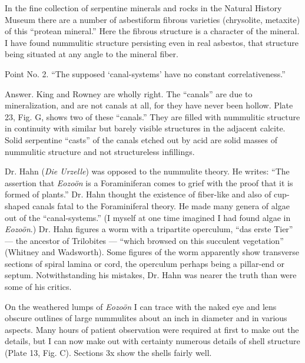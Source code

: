\documentclass[a4paper, 12pt, oneside]{article}
\begin{document}
In the fine collection of serpentine minerals and rocks in the Natural History Museum there are a number of asbestiform fibrous varieties (chrysolite, metaxite) of this ``protean mineral.'' Here the fibrous structure is a character of the mineral. I have found nummulitic structure persisting even in real asbestos, that structure being situated at any angle to the mineral fiber.

Point No. 2. ``The supposed `canal-systems' have no constant correlativeness.''

Answer. King and Rowney are wholly right. The ``canals'' are due to mineralization, and are not canals at all, for they have never been hollow. Plate 23, Fig. G, shows two of these ``canals.'' They are filled with nummulitic structure in continuity with similar but barely visible structures in the adjacent calcite. Solid serpentine ``casts'' of the canals etched out by acid are solid masses of nummulitic structure and not structureless infillings.

Dr. Hahn (\emph{Die Urzelle}) was opposed to the nummulite theory. He writes: ``The assertion that \emph{Eozoön} is a Foraminiferan comes to grief with the proof that it is formed of plants.'' Dr. Hahn thought the existence of fiber-like and also of cup-shaped canals fatal to the Foraminiferal theory. He made many genera of algae out of the ``canal-systems.'' (I myself at one time imagined I had found algae in \emph{Eozoön}.) Dr. Hahn figures a worm with a tripartite operculum, ``das erste Tier'' --- the ancestor of Trilobites --- ``which browsed on this succulent vegetation'' (Whitney and Wadsworth). Some figures of the worm apparently show transverse sections of spiral lamina or cord, the operculum perhaps being a pillar-end or septum. Notwithstanding his mistakes, Dr. Hahn was nearer the truth than were some of his critics.

On the weathered lumps of \emph{Eozoön} I can trace with the naked eye and lens obscure outlines of large nummulites about an inch in diameter and in various aspects. Many hours of patient observation were required at first to make out the details, but I can now make out with certainty numerous details of shell structure (Plate 13, Fig. C). Sections 3x show the shells fairly well.
\end{document}
